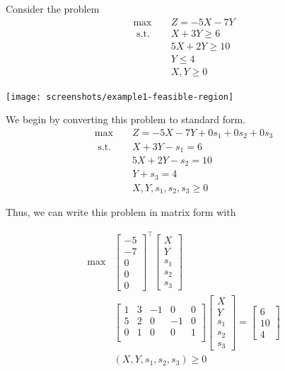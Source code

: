 \begin{example}{}{}
Consider the problem
\begin{align*}
\max \quad & Z =-5 X-7 Y  \\ 
\text { s.t. } \quad & X+3 Y \geq 6 \\ 
&5 X+ 2 Y \geq 10 \\ 
&Y  \leq 4 \\ 
&X, Y  \geq 0 
\end{align*}

\begin{center}
\texttt{[image: screenshots/example1-feasible-region]}
\end{center}

We begin by converting this problem to standard form.  
\begin{align*}
\max \quad & Z =-5 X-7 Y + 0s_1 + 0s_2 + 0 s_3\\ 
\text { s.t. } \quad & X+3 Y - s_1 = 6 \\ 
&5 X+ 2 Y - s_2 = 10 \\ 
&Y  + s_3 = 4 \\ 
&X, Y, s_1, s_2, s_3  \geq 0 
\end{align*}

Thus, we can write this problem in matrix form with 

\begin{align}
\max  & \begin{bmatrix}
-5 \\ -7 \\ 0 \\ 0 \\0
\end{bmatrix}^\top \begin{bmatrix}
X\\Y\\s_1\\s_2\\ s_3
\end{bmatrix}\\
&\begin{bmatrix}
1 & 3 & -1 & 0 & 0 \\
5 & 2 & 0 & -1 & 0\\
0 & 1 & 0 & 0 & 1\\
\end{bmatrix}
\begin{bmatrix}
X \\ Y \\ s_1 \\ s_2 \\ s_3
\end{bmatrix}
= 
\begin{bmatrix}
6 \\ 10 \\ 4
\end{bmatrix}\\
&(X,Y,s_1, s_2, s_3) \geq 0
\end{align}


\end{example}


